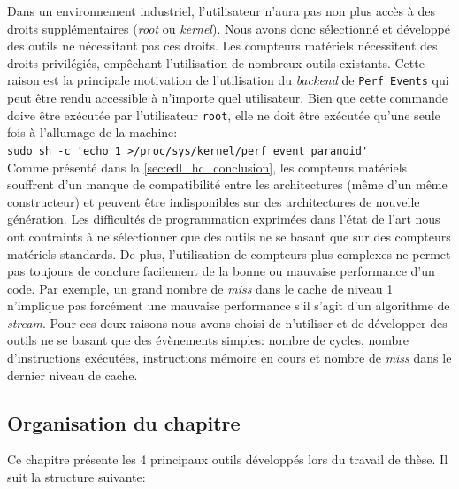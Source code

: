         Dans un environnement industriel, l'utilisateur n'aura pas non plus accès à des droits supplémentaires (\textit{root} ou \textit{kernel}). Nous avons donc sélectionné et développé des outils ne nécessitant pas ces droits. Les compteurs matériels nécessitent des droits privilégiés, empêchant l'utilisation de nombreux outils existants. Cette raison est la principale motivation de l'utilisation du \textit{backend} de \verb=Perf Events= qui peut être rendu accessible à n'importe quel utilisateur. Bien que cette commande doive être exécutée par l'utilisateur \verb=root=, elle ne doit être exécutée qu'une seule fois à l'allumage de la machine:\\
        \verb|sudo sh -c 'echo 1 >/proc/sys/kernel/perf_event_paranoid'|\\
        
        Comme présenté dans la \autoref{sec:edl_hc_conclusion}, les compteurs matériels souffrent d'un manque de compatibilité entre les architectures (même d'un même constructeur) et peuvent être indisponibles sur des architectures de nouvelle génération. Les difficultés de programmation exprimées dans l'état de l'art nous ont contraints à ne sélectionner que des outils ne se basant que sur des compteurs matériels standards. De plus, l'utilisation de compteurs plus complexes ne permet pas toujours de conclure facilement de la bonne ou mauvaise performance d'un code. Par exemple, un grand nombre de \textit{miss} dans le cache de niveau 1 n'implique pas forcément une mauvaise performance s'il s'agit d'un algorithme de \textit{stream}. Pour ces deux raisons nous avons choisi de n'utiliser et de développer des outils ne se basant que des évènements simples: nombre de cycles, nombre d'instructions exécutées, instructions mémoire en cours et nombre de \textit{miss} dans le dernier niveau de cache.
        
\subsection{Organisation du chapitre}
   
    Ce chapitre présente les 4 principaux outils développés lors du travail de thèse. Il suit la structure suivante:
   
